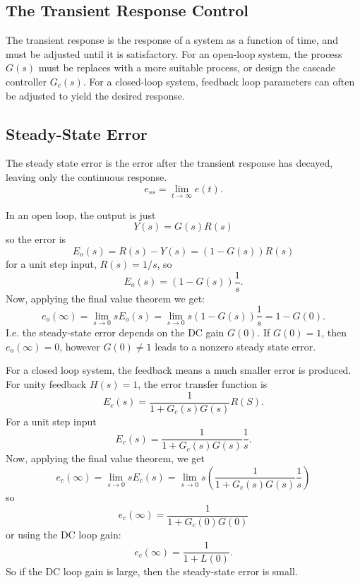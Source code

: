\subsection{The Transient Response Control}
The transient response is the response of a system as a function of time, and must be adjusted until it is satisfactory.
For an open-loop system, the process $G(s)$ must be replaces with a more suitable process, or design the cascade controller $G_c(s)$.
For a closed-loop system, feedback loop parameters can often be adjusted to yield the desired response.

\subsection{Steady-State Error}
The steady state error is the error after the transient response has decayed, leaving only the continuous response.
\begin{equation*}
  e_{ss} = \lim_{t \to \infty}e(t)
.\end{equation*}

In an open loop, the output is just
\begin{equation*}
  Y(s) = G(s) R(s)
\end{equation*}
so the error is
\begin{equation*}
  E_o(s) = R(s) - Y(s) = (1-G(s)) R(s)
\end{equation*}
for a unit step input, $R(s) = 1 / s$, so
\begin{equation*}
  E_o(s) = ( 1 - G(s)) \frac{1}{s}
.\end{equation*}
Now, applying the final value theorem we get:
\begin{equation*}
  e_o(\infty) = \lim_{s \to 0}sE_o(s) = \lim_{s \to 0}s \left( 1 - G(s) \right)\frac{1}{s} = 1 - G(0)
.\end{equation*}
I.e. the steady-state error depends on the DC gain $G(0)$.
If $G(0) = 1$, then $e_o(\infty) = 0$, however $G(0) \neq 1$ leads to a nonzero steady state error.

For a closed loop system, the feedback means a much smaller error is produced.
For unity feedback $H(s) = 1$, the error transfer function is
\begin{equation*}
  E_c(s) = \frac{1}{1 + G_c(s) G(s)}R(S)
.\end{equation*}
For a unit step input
\begin{equation*}
  E_c(s) = \frac{1}{1 + G_c(s) G(s)}\frac{1}{s}
.\end{equation*}
Now, applying the final value theorem, we get
\begin{equation*}
  e_c(\infty) = \lim_{s \to 0}s E_c(s) = \lim_{s \to 0}s \left( \frac{1}{1  + G_c(s) G(s)} \frac{1}{s} \right)
\end{equation*}
so
\begin{equation*}
  e_c(\infty) = \frac{1}{1 + G_c(0) G(0)}
\end{equation*}
or using the DC loop gain:
\begin{equation*}
  e_c(\infty) = \frac{1}{1 + L(0)}
.\end{equation*}
So if the DC loop gain is large, then the steady-state error is small.


